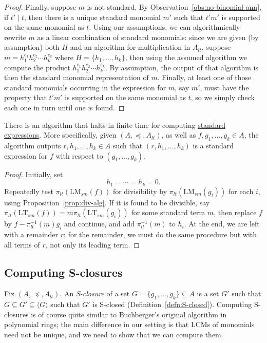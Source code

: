 \documentclass[11pt,reqno]{amsart}
\newcommand{\divides}{\mid}
\newcommand{\lmsm}{\text{LM}_{sm}}
\newcommand{\ltsm}{\text{LT}_{sm}}
\theoremstyle{definition}
\numberwithin{equation}{section}
\begin{document}
\begin{proof}
Finally, suppose $m$ is not standard. By Observation~\ref{obs:no-binomial-ann}, if $t' \divides t$, then there is a unique standard monomial $m'$ such that $t' m'$ is supported on the same monomial as $t$. Using our assumptions, we can algorithmically rewrite $m$ as a linear combination of standard monomials: since we are given (by assumption) both $H$ and an algorithm for multiplication in $A_{lt}$, suppose $m = h_1^{e_1} h_2^{e_2} \dotsb h_k^{e_k}$ where $H = \{h_1,\dotsc,h_k\}$, then using the assumed algorithm we compute the product $h_1^{e_1} h_2^{e_2} \dotsb h_k^{e_k}$. By assumption, the output of that algorithm is then the standard monomial representation of $m$. Finally, at least one of those standard monomials occurring in the expression for $m$, say $m'$, must have the property that $t'm'$ is supported on the same monomial as $t$, so we simply check each one in turn until one is found. 
\end{proof}

\begin{corollary} \label{cor:std-exp-alg}
There is an algorithm that halts in finite time for computing \hyperref[defn:standard-expression]{standard expressions}. More specifically, given $(A,\preceq, A_{lt})$, as well as $f, g_1, \dotsc, g_k \in A$, the algorithm outputs $r,h_1, \dotsc, h_k \in A$ such that $(r,h_1,\dotsc,h_k)$ is a standard expression for $f$ with respect to $(g_1, \dotsc, g_k)$. 
\end{corollary}

\begin{proof}
Initially, set 
\[
h_1 = \dotsb = h_k = 0.
\]
Repeatedly test $\pi_{lt}(\lmsm(f))$ for divisibility by $\pi_{lt}(\lmsm(g_i))$ for each $i$, using Proposition~\ref{prop:div-alg}. If it is found to be divisible, say $\pi_{lt}(\ltsm(f)) = m \pi_{lt}(\ltsm(g_i))$ for some standard term $m$, then replace $f$ by $f - \pi_{lt}^{-1}(m) g_i$ and continue, and add $\pi_{lt}^{-1}(m)$ to $h_i$. At the end, we are left with a remainder $r$; for the remainder, we must do the same procedure but with all terms of $r$, not only its leading term. 
\end{proof}

\subsection{Computing S-closures}

Fix $(A, \preceq, A_{lt})$. An \emph{S-closure} of a set $G=\{g_1, \dotsc, g_k\} \subseteq A$ is a set $G'$ such that $G \subseteq G' \subseteq \langle G \rangle$ such that $G'$ is S-closed (Definition~\ref{defn:S-closed}). Computing S-closures is of course quite similar to Buchberger's original algorithm in polynomial rings; the main difference in our setting is that LCMs of monomials need not be unique, and we need to show that we can compute them.
\end{document}
